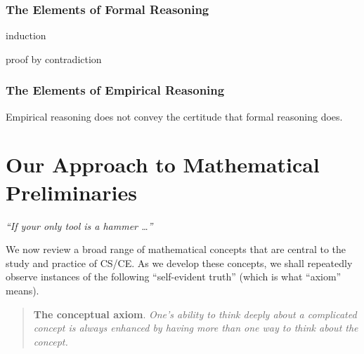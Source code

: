 \subsubsection{The Elements of Formal Reasoning}

induction

proof by contradiction

\subsubsection{The Elements of Empirical Reasoning}

Empirical reasoning does not convey the certitude that formal
reasoning does.  



\section{Our Approach to Mathematical Preliminaries}

\hfill{\small\em
``If your only tool is a hammer \ldots''
}

\vspace*{.25in}

\noindent
We now review a broad range of mathematical concepts that are central
to the study and practice of CS/CE.  As we develop these concepts, we
shall repeatedly observe instances of the following ``self-evident
truth'' (which is what ``axiom'' means).

\begin{quote}
{\bf The conceptual axiom}.
{\em
One's ability to think deeply about a complicated concept is always
enhanced by having more than one way to think about the concept.}
\end{quote}
